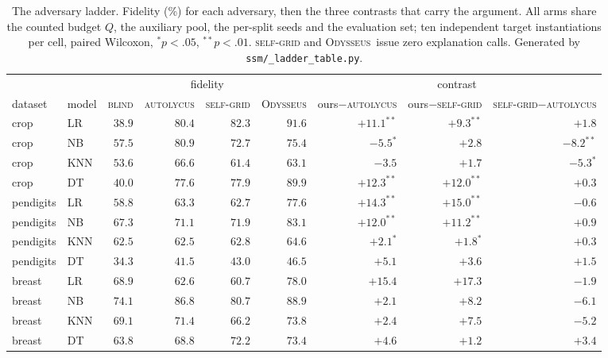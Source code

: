 \documentclass[sigconf,anonymous,review]{acmart}
\newcommand{\sys}{\textsc{Odysseus}}
\begin{document}
\begin{table}[t]
\centering
\caption{The adversary ladder. Fidelity (\%) for each adversary, then the three contrasts that carry
the argument. All arms share the counted budget $Q$, the auxiliary pool, the per-split seeds and the
evaluation set; ten independent target instantiations per cell, paired Wilcoxon, $^{*}p{<}.05$,
$^{**}p{<}.01$. \textsc{self-grid} and \sys\ issue zero explanation calls.
Generated by \texttt{ssm/\_ladder\_table.py}.}
\label{tab:ladder}
\begin{tabular}{llrrrrrrr}
\toprule
& & \multicolumn{4}{c}{fidelity} & \multicolumn{3}{c}{contrast} \\
\cmidrule(lr){3-6}\cmidrule(lr){7-9}
dataset & model & \textsc{blind} & \textsc{autolycus} & \textsc{self-grid} & \sys
& ours$-$\textsc{autolycus} & ours$-$\textsc{self-grid} & \textsc{self-grid}$-$\textsc{autolycus} \\
\midrule
crop       & LR   & $38.9$ & $80.4$ & $82.3$ & $91.6$ & $+11.1^{**}$ & $+9.3^{**}$ & $+1.8$ \\
crop       & NB   & $57.5$ & $80.9$ & $72.7$ & $75.4$ & $-5.5^{*}$ & $+2.8$ & $-8.2^{**}$ \\
crop       & KNN  & $53.6$ & $66.6$ & $61.4$ & $63.1$ & $-3.5$ & $+1.7$ & $-5.3^{*}$ \\
crop       & DT   & $40.0$ & $77.6$ & $77.9$ & $89.9$ & $+12.3^{**}$ & $+12.0^{**}$ & $+0.3$ \\
\addlinespace
pendigits  & LR   & $58.8$ & $63.3$ & $62.7$ & $77.6$ & $+14.3^{**}$ & $+15.0^{**}$ & $-0.6$ \\
pendigits  & NB   & $67.3$ & $71.1$ & $71.9$ & $83.1$ & $+12.0^{**}$ & $+11.2^{**}$ & $+0.9$ \\
pendigits  & KNN  & $62.5$ & $62.5$ & $62.8$ & $64.6$ & $+2.1^{*}$ & $+1.8^{*}$ & $+0.3$ \\
pendigits  & DT   & $34.3$ & $41.5$ & $43.0$ & $46.5$ & $+5.1$ & $+3.6$ & $+1.5$ \\
\addlinespace
breast     & LR   & $68.9$ & $62.6$ & $60.7$ & $78.0$ & $+15.4$ & $+17.3$ & $-1.9$ \\
breast     & NB   & $74.1$ & $86.8$ & $80.7$ & $88.9$ & $+2.1$ & $+8.2$ & $-6.1$ \\
breast     & KNN  & $69.1$ & $71.4$ & $66.2$ & $73.8$ & $+2.4$ & $+7.5$ & $-5.2$ \\
breast     & DT   & $63.8$ & $68.8$ & $72.2$ & $73.4$ & $+4.6$ & $+1.2$ & $+3.4$ \\

\end{tabular}
\end{table}
\end{document}

